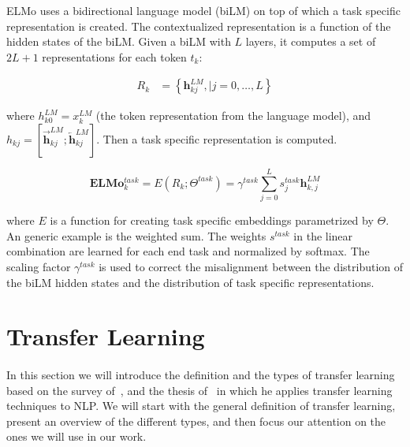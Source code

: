 ELMo uses a bidirectional language model (biLM) on top of which a task specific representation is created. The contextualized representation is a function of the hidden states of the biLM. Given a biLM with $L$ layers, it computes a set of $2L+1$ representations for each token $t_k$:

\begin{equation}
\begin{split}
R_{k} & =\left\{\mathbf{h}_{kj}^{LM},| j=0, \ldots, L\right\}    
\end{split}
\end{equation}
 

where $h_{k0}^{LM} = x_k^{LM}$ (the token representation from the language model), and $h_{kj} = [\overrightarrow{\mathbf{h}}_{k j}^{LM}; \overleftarrow{\mathbf{h}}_{k j}^{L M}]$. Then a task specific representation is computed.

\begin{equation}
\mathbf{E} \mathbf{L} \mathbf{M} \mathbf{o}_{k}^{task}=E\left(R_{k} ; \Theta^{task}\right)=\gamma^{t a s k} \sum_{j=0}^{L} s_{j}^{task} \mathbf{h}_{k, j}^{LM}
\end{equation}

where  $E$ is a function for creating task specific embeddings parametrized by $\Theta$. An generic example is the weighted sum. The weights $s^{task}$ in the linear combination are learned for each end task and normalized by softmax. The scaling factor $\gamma^{task}$ is used to correct the misalignment between the distribution of the biLM hidden states and the distribution of task specific representations.



\section{Transfer Learning}
\label{sec:transfer_learning}

\paragraph{}
In this section we will introduce the definition and the types of transfer learning based on the survey of~\cite{pan2010transfer}, and the thesis of~\cite{ruder2019neural} in which he applies transfer learning techniques to NLP. We will start with the general definition of transfer learning, present an overview of the different types, and then focus our attention on the ones we will use in our work. 


